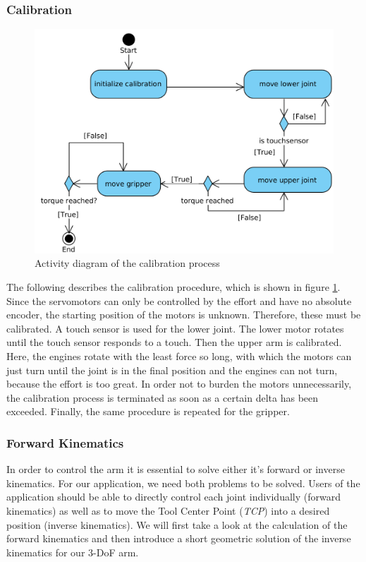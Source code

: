 \documentclass[conference]{IEEEtran}
\begin{document}
\subsubsection{Calibration}\label{sec:calibration}
\begin{figure}[htbp] 
	\centering
	\includegraphics[width=\textwidth/2]{img/calibration.png}
	\caption[caption]{Activity diagram of the calibration process}
\label{fig:calibration}
\end{figure}
The following describes the calibration procedure, which is shown in figure \ref{fig:calibration}. Since the servomotors can only be controlled by the effort and have no absolute encoder, the starting position of the motors is unknown. Therefore, these must be calibrated. A touch sensor is used for the lower joint. The lower motor rotates until the touch sensor responds to a touch. Then the upper arm is calibrated. Here, the engines rotate with the least force so long, with which the motors can just turn until the joint is in the final position and the engines can not turn, because the effort is too great. In order not to burden the motors unnecessarily, the calibration process is terminated as soon as a certain delta has been exceeded. Finally, the same procedure is repeated for the gripper.

\subsubsection{Forward Kinematics}\label{sec:forwardkinematics}
In order to control the arm it is essential to solve either it's forward or inverse kinematics. For our application, we need both problems to be solved. Users of the application should be able to directly control each joint individually (forward kinematics) as well as to move the Tool Center Point (\textit{TCP}) into a desired position (inverse kinematics). We will first take a look at the calculation of the forward kinematics and then introduce a short geometric solution of the inverse kinematics for our 3-DoF arm.
\end{document}

